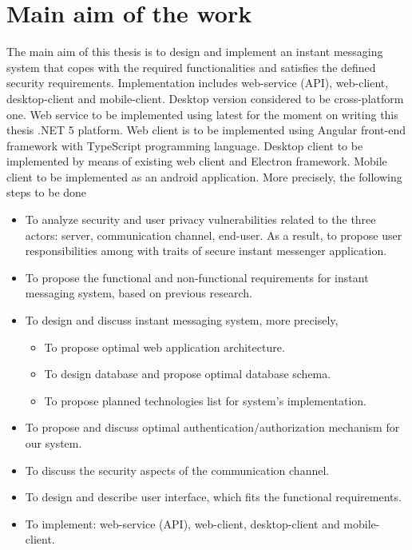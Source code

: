 \chapter{Main aim of the work}\label{ch:main-aim-of-the-work}

The main aim of this thesis is to design and implement an instant messaging system
that copes with the required functionalities and satisfies the defined security requirements.
Implementation includes web-service (API), web-client, desktop-client and mobile-client.
Desktop version considered to be cross-platform one.
Web service to be implemented using latest for the moment on writing this thesis .NET 5 platform.
Web client is to be implemented using Angular front-end framework with TypeScript programming language.
Desktop client to be implemented by means of existing web client and Electron framework.
Mobile client to be implemented as an android application.
More precisely, the following steps to be done
\begin{itemize}
    \item To analyze security and user privacy vulnerabilities related to the three
    actors: server, communication channel, end-user.
    As a result, to propose user responsibilities among with traits of secure instant messenger application.
    \item To propose the functional and non-functional requirements for instant messaging system, based on previous
    research.
    \item To design and discuss instant messaging system, more precisely,
    \begin{itemize}
        \item To propose optimal web application architecture.
        \item To design database and propose optimal database schema.
        \item To propose planned technologies list for system's implementation.
    \end{itemize}
    \item To propose and discuss optimal authentication/authorization mechanism for our system.
    \item To discuss the security aspects of the communication channel.
    \item To design and describe user interface, which fits the functional requirements.
    \item To implement: web-service (API), web-client, desktop-client and mobile-client.
\end{itemize}